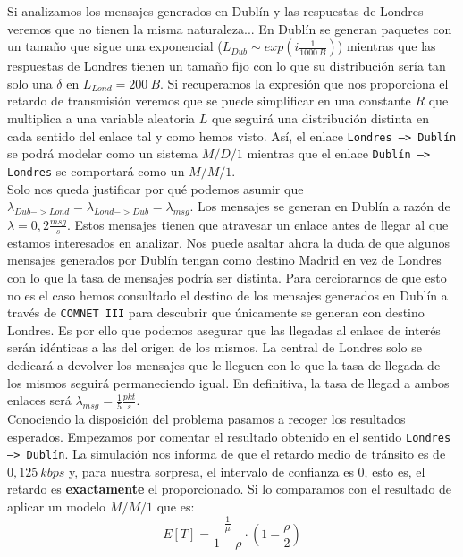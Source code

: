 \documentclass{article}[10pt]
\begin{document}
		Si analizamos los mensajes generados en Dublín y las respuestas de Londres veremos que no tienen la misma naturaleza... En Dublín se generan paquetes con un tamaño que sigue una exponencial ($L_{Dub} \sim exp(i\frac{1}{1000\ B})$) mientras que las respuestas de Londres tienen un tamaño fijo con lo que su distribución sería tan solo una $\delta$ en $L_{Lond} = 200\ B$. Si recuperamos la expresión que nos proporciona el retardo de transmisión veremos que se puede simplificar en una constante $R$ que multiplica a una variable aleatoria $L$ que seguirá una distribución distinta en cada sentido del enlace tal y como hemos visto. Así, el enlace \texttt{Londres --> Dublín} se podrá modelar como un sistema $M/D/1$ mientras que el enlace \texttt{Dublín --> Londres} se comportará como un $M/M/1$.\\

		Solo nos queda justificar por qué podemos asumir que $\lambda_{Dub -> Lond} = \lambda_{Lond -> Dub} = \lambda_{msg}$. Los mensajes se generan en Dublín a razón de $\lambda = 0,2 \frac{msg}{s}$. Estos mensajes tienen que atravesar un enlace antes de llegar al que estamos interesados en analizar. Nos puede asaltar ahora la duda de que algunos mensajes generados por Dublín tengan como destino Madrid en vez de Londres con lo que la tasa de mensajes podría ser distinta. Para cerciorarnos de que esto no es el caso hemos consultado el destino de los mensajes generados en Dublín a través de \texttt{COMNET III} para descubrir que únicamente se generan con destino Londres. Es por ello que podemos asegurar que las llegadas al enlace de interés serán idénticas a las del origen de los mismos. La central de Londres solo se dedicará a devolver los mensajes que le lleguen con lo que la tasa de llegada de los mismos seguirá permaneciendo igual. En definitiva, la tasa de llegad a ambos enlaces será $\lambda_{msg} = \frac{1}{5} \frac{pkt}{s}$.\\

		Conociendo la disposición del problema pasamos a recoger los resultados esperados. Empezamos por comentar el resultado obtenido en el sentido \texttt{Londres --> Dublín}. La simulación nos informa de que el retardo medio de tránsito es de $0,125\ kbps$ y, para nuestra sorpresa, el intervalo de confianza es $0$, esto es, el retardo es \textbf{exactamente} el proporcionado. Si lo comparamos con el resultado de aplicar un modelo $M/M/1$ que es:
		$$E[T] = \frac{\frac{1}{\mu}}{1 - \rho} \cdot (1 - \frac{\rho}{2})$$
\end{document}
